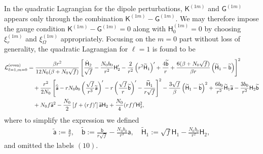 \documentclass[aps,prd,preprintnumbers,superscriptaddress,nofootinbib,notitlepage]{revtex4-2}
\begin{document}
In the quadratic Lagrangian for the dipole perturbations,
$\mathsf{K}^{(1m)}$ and $\mathsf{G}^{(1m)}$ appears only through the combination
$\mathsf{K}^{(1m)}-\mathsf{G}^{(1m)}$. We may therefore impose the gauge condition
$\mathsf{K}^{(1m)}-\mathsf{G}^{(1m)}=0$ along with $\mathsf{H}_0^{(1m)}=0$
by choosing $\xi_r^{(1m)}$ and $\xi_\Omega^{(1m)}$ appropriately.
Focusing on the $m=0$ part without loss of generality,
the quadratic Lagrangian for $\ell=1$ is found to be
\begin{align}
{\cal L}_{\ell=1,m=0}^{(\textrm{even})}&=\frac{\beta r^2}{12N_0(\beta+N_0\sqrt{f})}
\left[\frac{\dot{\mathsf{H}}_2}{\sqrt{f}}
-\frac{N_0b_0}{r^2}\mathsf{H}_2'-\frac{2}{r^2}\left(r^2\widetilde{\mathsf{H}}_1\right)'
+\frac{4\widetilde{\mathsf{b}}}{r}
+\frac{6(\beta+N_0\sqrt{f})}{\beta r}
\left(\widetilde{\mathsf{H}}_1-\widetilde{\mathsf{b}}\right)
\right]^2
\notag \\
&\quad
+\frac{r^2}{2N_0}\left[
\dot{\widetilde{\mathsf{a}}}-rN_0b_0\left(\frac{\sqrt{f}}{r^3}\widetilde{\mathsf{a}}\right)'
-r\left(\frac{\sqrt{f}}{r}\widetilde{\mathsf{b}}\right)'
-\frac{\widetilde{\mathsf{H}}_1}{r\sqrt{f}}
\right]^2
-\frac{3\sqrt{f}}{\beta}\left(\widetilde{\mathsf{H}}_1-\widetilde{\mathsf{b}}\right)^2
+\frac{6b_0}{r^2}\widetilde{\mathsf{H}}_1\widetilde{\mathsf{a}}
-\frac{3b_0}{r^2}\mathsf{H}_2\widetilde{\mathsf{b}}
\notag \\ &\quad
+N_0f\widetilde{\mathsf{a}}^2-\frac{N_0}{2}\left[f+(rf)'\right]
\widetilde{\mathsf{a}}\mathsf{H}_2+\frac{N_0}{4}(rf)'\mathsf{H}_2^2\label{Lag:even_l=1},
\end{align}
where to simplify the expression we defined
\begin{align}
\widetilde{\mathsf{a}}:=\frac{\mathsf{a}}{r},
\quad
\widetilde{\mathsf{b}}:=\frac{\mathsf{b}}{r\sqrt{f}}-\frac{N_0b_0}{r^3}\mathsf{a},
\quad
\widetilde{\mathsf{H}}_1:=\sqrt{f}\mathsf{H}_1-\frac{N_0b_0}{r^2}\mathsf{H}_2,
\label{def:tilde}
\end{align}
and omitted the labels $(10)$.
\end{document}
